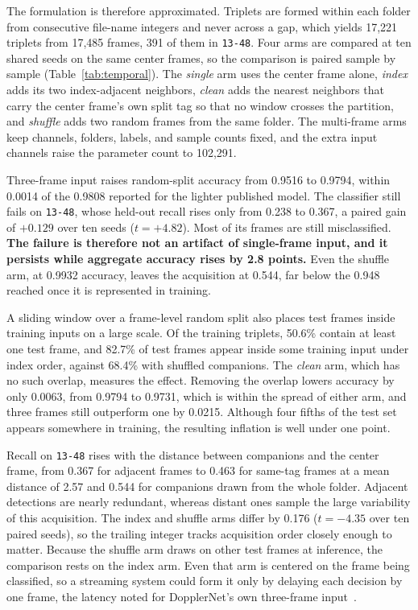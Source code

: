\documentclass[conference]{IEEEtran}
\begin{document}
The formulation is therefore approximated. Triplets are formed within each folder from consecutive file-name integers and never across a gap, which yields 17,221 triplets from 17,485 frames, 391 of them in \texttt{13-48}. Four arms are compared at ten shared seeds on the same center frames, so the comparison is paired sample by sample (Table~\ref{tab:temporal}). The \emph{single} arm uses the center frame alone, \emph{index} adds its two index-adjacent neighbors, \emph{clean} adds the nearest neighbors that carry the center frame's own split tag so that no window crosses the partition, and \emph{shuffle} adds two random frames from the same folder. The multi-frame arms keep channels, folders, labels, and sample counts fixed, and the extra input channels raise the parameter count to 102,291.

Three-frame input raises random-split accuracy from 0.9516 to 0.9794, within 0.0014 of the 0.9808 reported for the lighter published model. The classifier still fails on \texttt{13-48}, whose held-out recall rises only from 0.238 to 0.367, a paired gain of $+0.129$ over ten seeds ($t=+4.82$). Most of its frames are still misclassified. \textbf{The failure is therefore not an artifact of single-frame input, and it persists while aggregate accuracy rises by 2.8 points.} Even the shuffle arm, at 0.9932 accuracy, leaves the acquisition at 0.544, far below the 0.948 reached once it is represented in training.

A sliding window over a frame-level random split also places test frames inside training inputs on a large scale. Of the training triplets, 50.6\% contain at least one test frame, and 82.7\% of test frames appear inside some training input under index order, against 68.4\% with shuffled companions. The \emph{clean} arm, which has no such overlap, measures the effect. Removing the overlap lowers accuracy by only 0.0063, from 0.9794 to 0.9731, which is within the spread of either arm, and three frames still outperform one by 0.0215. Although four fifths of the test set appears somewhere in training, the resulting inflation is well under one point.

Recall on \texttt{13-48} rises with the distance between companions and the center frame, from 0.367 for adjacent frames to 0.463 for same-tag frames at a mean distance of 2.57 and 0.544 for companions drawn from the whole folder. Adjacent detections are nearly redundant, whereas distant ones sample the large variability of this acquisition. The index and shuffle arms differ by 0.176 ($t=-4.35$ over ten paired seeds), so the trailing integer tracks acquisition order closely enough to matter. Because the shuffle arm draws on other test frames at inference, the comparison rests on the index arm. Even that arm is centered on the frame being classified, so a streaming system could form it only by delaying each decision by one frame, the latency noted for DopplerNet's own three-frame input~\cite{roldan2020}.
\end{document}
